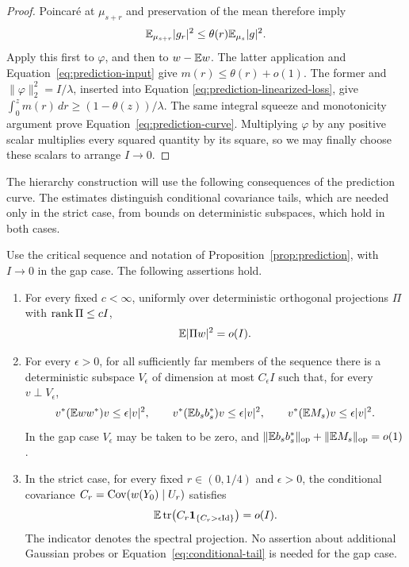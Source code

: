 \begin{proof}
Poincar\'e at $\mu_{s+r}$ and preservation of the mean therefore imply
\[
 \mathbb E_{\mu_{s+r}}|g_r|^2\le\theta(r)\mathbb E_{\mu_s}|g|^2.
\]
Apply this first to $\varphi$, and then to $w-\mathbb E w$.
The latter application and Equation~\eqref{eq:prediction-input} give
$m(r)\le\theta(r)+o(1)$.  The former and
$\|\varphi\|_2^2=I/\lambda$, inserted into Equation
\eqref{eq:prediction-linearized-loss}, give
$\int_0^z m(r)\,dr\ge(1-\theta(z))/\lambda$.
The same integral squeeze and monotonicity argument prove
Equation~\eqref{eq:prediction-curve}.  Multiplying $\varphi$ by any
positive scalar multiplies every squared quantity by its square, so
we may finally choose these scalars to arrange $I\to0$.
\end{proof}

The hierarchy construction will use the following consequences of the
prediction curve.  The estimates distinguish conditional covariance
tails, which are needed only in the strict case, from bounds on
deterministic subspaces, which hold in both cases.

\begin{lemma}
\label{lem:posterior-outliers}
Use the critical sequence and notation of
Proposition~\ref{prop:prediction}, with $I\to0$ in the gap case.
The following assertions hold.
\begin{enumerate}[label=\textup{(\roman*)}]
\item For every fixed $c<\infty$, uniformly over deterministic
orthogonal projections $\Pi$ with $\operatorname{rank}\Pi\le cI$,
\begin{equation}
 \mathbb E|\Pi w|^2=o(I).
 \label{eq:prediction-small-subspaces}
\end{equation}
\item For every $\epsilon>0$, for all sufficiently far members of the
sequence there is a deterministic subspace $V_\epsilon$ of dimension
at most $C_\epsilon I$ such that, for every $v\perp V_\epsilon$,
\begin{equation}
 v^*(\mathbb E ww^*)v\le\epsilon|v|^2,\qquad
 v^*(\mathbb E b_sb_s^*)v\le\epsilon|v|^2,\qquad
 v^*(\mathbb E M_s)v\le\epsilon|v|^2.
 \label{eq:prediction-outlier-subspaces}
\end{equation}
In the gap case $V_\epsilon$ may be taken to be zero, and
$\|\mathbb E b_sb_s^*\|_{\mathrm{op}}+\|\mathbb E M_s\|_{\mathrm{op}}=o(1)$.
\item In the strict case, for every fixed $r\in(0,1/4)$ and
$\epsilon>0$, the conditional covariance
$C_r=\operatorname{Cov}(w(Y_0)\mid U_r)$ satisfies
\begin{equation}
 \mathbb E\operatorname{tr}\bigl(C_r\mathbf 1_{\{C_r>\epsilon\mathrm{Id}\}}\bigr)=o(I).
 \label{eq:conditional-tail}
\end{equation}
The indicator denotes the spectral projection.  No assertion about
additional Gaussian probes or Equation~\eqref{eq:conditional-tail}
is needed for the gap case.
\end{enumerate}
\end{lemma}

